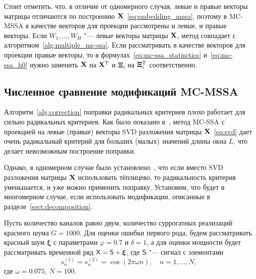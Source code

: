 \documentclass[specialist,
substylefile = spbu_report.rtx,
subf,href,colorlinks=true, 12pt]{disser}
\theoremstyle{definition}
\newcommand{\bfxi}{\boldsymbol{\xi}}
\begin{document}
Стоит отметить, что, в отличие от одномерного случая, левые и правые векторы матрицы отличаются по построению $\mathbf{X}$~\eqref{eq:embedding_mssa}, поэтому в MC-MSSA в качестве векторов для проекции рассмотрены и левые, и правые векторы. Если $W_1,\ldots,W_H$ "--- левые векторы матрицы $\mathbf{X}$, метод совпадает с алгоритмом~\ref{alg:multiple_mc-ssa}. Если рассматривать в качестве векторов для проекции правые векторы, то в формулах~\eqref{eq:mc-ssa_statisctics} и~\eqref{eq:mc-ssa_h0} нужно заменить $\mathbf{X}$ на $\mathbf{X}^{\mathrm{T}}$ и $\mathbf{\Xi}_i$ на $\mathbf{\Xi}_i^{\mathrm{T}}$ соответственно.

\subsection{Численное сравнение модификаций MC-MSSA}\label{mc-mssa_numeric_comparison}
Алгоритм~\ref{alg:correction} поправки радикальных критериев плохо работает для сильно радикальных критериев. Как было показано в~\cite[Приложение  Б.2.4]{Larin_2022}, метод MC-SSA с проекцией на левые (правые) векторы SVD разложения матрицы $\mathbf{X}$~\eqref{eq:svd} дает очень радикальный критерий для больших (малых) значений длины окна $L$, что делает невозможным построение поправки.

Однако, в одномерном случае было установлено~\cite{Larin_2022}, что если вместо SVD разложения матрицы $\mathbf{X}$ использовать тёплицево, то радикальность критерия уменьшается, и уже можно применить поправку. Установим, что будет в многомерном случае, если использовать модификации, описанные в разделе~\ref{sect:decomposition}.

Пусть количество каналов равно двум, количество суррогатных реализаций красного шума $G=1000$. Для оценки ошибки первого рода, будем рассматривать красный шум $\bfxi$ с параметрами $\varphi=0.7$ и $\delta=1$, а для оценки мощности будет рассматривать временной ряд $\tX=\tS+\bfxi$, где $\mathsf{S}$ "--- сигнал с элементами
\[
	s_n^{(1)}=s_n^{(2)}=\cos(2\pi\omega n),\quad n=1,\ldots, N,
\]
где $\omega=0.075$, $N=100$.
\end{document}
